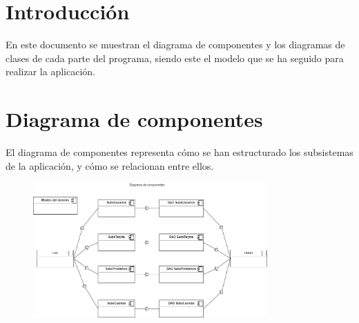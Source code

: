\documentclass[12pt]{article}
\begin{document}
\section*{Introducción} %
En este documento se muestran el diagrama de componentes y los diagramas de clases de cada parte del programa, siendo este el modelo que se ha seguido para realizar la aplicación.

\section{Diagrama de componentes} %
El diagrama de componentes representa cómo se han estructurado los subsistemas de la aplicación, y cómo se relacionan entre ellos.
\begin{figure}[H]
    \centering
    \includegraphics[width=0.8\textwidth]{images/DiagramaDeComponentes.png}
\end{figure}

\newpage
\end{document}
